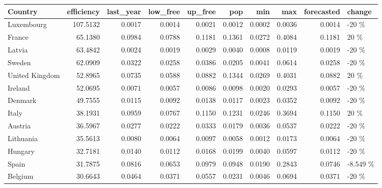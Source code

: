 \documentclass[a4paper,twoside,10pt]{article}
\begin{document}
\begin{table}[H]
	\centering
	\begin{tabular}{lrrrrrrrrl}
		\hline
		Country & efficiency & last\_year & low\_free & up\_free & pop & min & max & forecasted & change \\ 
		\hline
	\rowcolor[rgb]{0.8,1,0.8}	 Luxembourg & 107.5132 & 0.0017 & \cellcolor[rgb]{0.9,0.9,0.9} 0.0014 & 0.0021 & 0.0012 & 0.0002 & 0.0036 & 0.0014 & -20 \% \\ 
	\rowcolor[rgb]{1,0.8,0.8}	France & 65.1380 & 0.0984 & 0.0788 &\cellcolor[rgb]{0.9,0.9,0.9} 0.1181 & 0.1361 & 0.0272 & 0.4084 & 0.1181 & 20 \% \\ 
	\rowcolor[rgb]{0.8,0.8,1}	Latvia & 63.4842 & 0.0024 & \cellcolor[rgb]{0.9,0.9,0.9} 0.0019 & 0.0029 & 0.0040 & 0.0008 & 0.0119 & 0.0019 & -20 \% \\ 
	\rowcolor[rgb]{0.8,1,0.8}	 Sweden & 62.0909 & 0.0322 &\cellcolor[rgb]{0.9,0.9,0.9} 0.0258 & 0.0386 & 0.0205 & 0.0041 & 0.0614 & 0.0258 & -20 \% \\ 
		 \rowcolor[rgb]{1,0.8,0.8}United Kingdom & 52.8965 & 0.0735 & 0.0588 &\cellcolor[rgb]{0.9,0.9,0.9} 0.0882 & 0.1344 & 0.0269 & 0.4031 & 0.0882 & 20 \% \\ 
	\rowcolor[rgb]{0.8,1,0.8}	 Ireland & 52.0695 & 0.0071 &\cellcolor[rgb]{0.9,0.9,0.9} 0.0057 & 0.0086 & 0.0098 & 0.0020 & 0.0293 & 0.0057 & -20 \% \\ 
	\rowcolor[rgb]{0.8,1,0.8}	Denmark & 49.7555 & 0.0115 &\cellcolor[rgb]{0.9,0.9,0.9} 0.0092 & 0.0138 & 0.0117 & 0.0023 & 0.0352 & 0.0092 & -20 \% \\ 
	\rowcolor[rgb]{1,0.8,0.8}	Italy & 38.1931 & 0.0959 & 0.0767 &\cellcolor[rgb]{0.9,0.9,0.9} 0.1150 & 0.1231 & 0.0246 & 0.3694 & 0.1150 & 20 \% \\ 
	\rowcolor[rgb]{0.8,1,0.8}	 Austria & 36.5967 & 0.0277 &\cellcolor[rgb]{0.9,0.9,0.9} 0.0222 & 0.0333 & 0.0179 & 0.0036 & 0.0537 & 0.0222 & -20 \% \\ 
	\rowcolor[rgb]{0.8,0.8,1}	 Lithuania & 35.5613 & 0.0080 &\cellcolor[rgb]{0.9,0.9,0.9} 0.0064 & 0.0097 & 0.0058 & 0.0012 & 0.0173 & 0.0064 & -20 \% \\ 
	\rowcolor[rgb]{0.8,0.8,1}	 Hungary & 32.7181 & 0.0140 &\cellcolor[rgb]{0.9,0.9,0.9} 0.0112 & 0.0168 & 0.0199 & 0.0040 & 0.0597 & 0.0112 & -20 \% \\ 
	\rowcolor[rgb]{1,0.8,0.8}	Spain & 31.7875 & 0.0816 & 0.0653 & 0.0979 & 0.0948 & 0.0190 & 0.2843 & 0.0746 & -8.549 \% \\ 
	\rowcolor[rgb]{0.8,1,0.8}	Belgium & 30.6643 & 0.0464 &\cellcolor[rgb]{0.9,0.9,0.9} 0.0371 & 0.0557 & 0.0231 & 0.0046 & 0.0694 & 0.0371 & -20 \% \\ 

\end{tabular}
\end{table}
\end{document}
